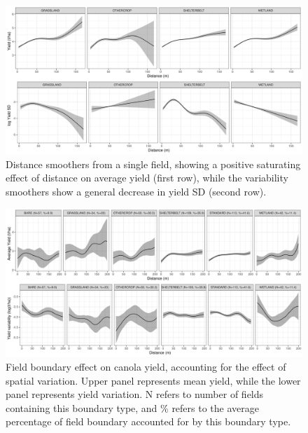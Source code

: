 \documentclass[]{elsarticle} %
\begin{document}
\newpage

\begin{figure}
\includegraphics[width=1\linewidth]{distSmooths} \caption{Distance smoothers from a single field, showing a positive saturating effect of distance on average yield (first row), while the variability smoothers show a general decrease in yield SD (second row).}
\end{figure}

\newpage

\begin{figure}
\includegraphics[width=1\linewidth]{ModelSummary3a_canola} \caption{Field boundary effect on canola yield, accounting for the effect of spatial variation. Upper panel represents mean yield, while the lower panel represents yield variation. N refers to number of fields containing this boundary type, and \% refers to the average percentage of field boundary accounted for by this boundary type.}
\end{figure}

\newpage
\end{document}
